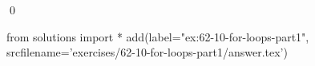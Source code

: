 
\begin{ex}
  \label{ex:62-10-for-loops-part1}
  
  \qed
\end{ex}
\begin{python0}
from solutions import *
add(label="ex:62-10-for-loops-part1",
    srcfilename='exercises/62-10-for-loops-part1/answer.tex')
\end{python0}

